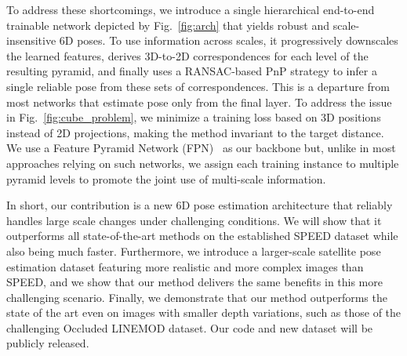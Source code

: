 To address these shortcomings, we introduce a single hierarchical end-to-end trainable network depicted by Fig.~\ref{fig:arch} that yields robust and scale-insensitive 6D poses. 
To use information across scales, it progressively downscales the learned features,  derives 3D-to-2D correspondences for each level of the resulting pyramid, and finally uses a RANSAC-based PnP strategy to infer a single reliable pose from these sets of correspondences. This is a departure from most networks that estimate pose only from the final layer. 
To address the issue in Fig.~\ref{fig:cube_problem}, we minimize a training loss based on 3D positions instead of 2D projections, making the method invariant to the target distance.
We use a Feature Pyramid Network (FPN)~\cite{Lin17e} as our backbone but, unlike in most approaches relying on such networks, we assign each training instance to multiple pyramid levels to promote the joint use of multi-scale information. 

In short, our contribution is a new 6D pose estimation architecture that reliably handles large scale changes under challenging conditions. We will show that it outperforms all state-of-the-art methods on the established SPEED dataset while also being much faster. Furthermore, we introduce a larger-scale satellite pose estimation dataset featuring more realistic and more complex images than SPEED, and we show that our method delivers the same benefits in this more challenging scenario. Finally, we demonstrate that our method outperforms the state of the art even on images with smaller depth variations, such as those of the challenging Occluded LINEMOD dataset. Our code and new dataset will be publicly released.




%




